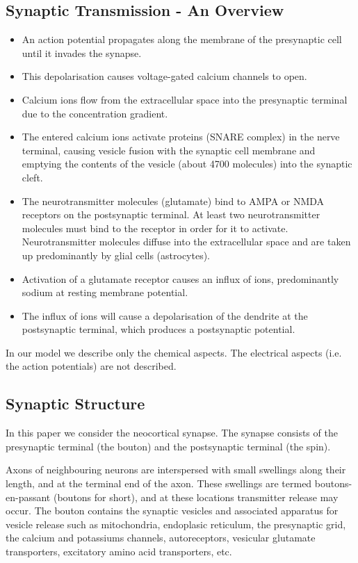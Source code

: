 \documentclass[a4paper]{article}
\begin{document}
\subsection{Synaptic Transmission - An Overview}
\begin{itemize}
    \item An action potential propagates along the membrane of the presynaptic cell until it invades the synapse.
    \item This depolarisation causes voltage-gated calcium channels to open.
    \item Calcium ions flow from the extracellular space into the presynaptic terminal due to the concentration gradient.
    \item The entered calcium ions activate proteins (SNARE complex) in the nerve terminal, causing vesicle fusion with the synaptic cell membrane and emptying the contents of the vesicle (about 4700 molecules) into the synaptic cleft.
    \item The neurotransmitter molecules (glutamate) bind to AMPA or NMDA receptors on the postsynaptic terminal. At least two neurotransmitter molecules  must bind to the receptor in order for it to activate. Neurotransmitter molecules diffuse into the extracellular space and are taken up predominantly by glial cells (astrocytes). 
    \item Activation of a glutamate receptor causes an influx of ions, predominantly sodium at resting membrane potential. 
    \item The influx of ions will cause a depolarisation of the dendrite at the postsynaptic terminal, which produces a postsynaptic potential.
\end{itemize}

In our model we describe only the chemical aspects. The electrical aspects (i.e. the action potentials) are not described.

\subsection{Synaptic Structure}
In this paper we consider the neocortical synapse. The synapse consists of the presynaptic terminal (the bouton) and the postsynaptic terminal (the spin). 

Axons of neighbouring neurons are interspersed with small swellings along their length, and at the terminal end of the axon. These swellings are termed boutons-en-passant (boutons for short), and at these locations transmitter release may occur. The bouton contains the synaptic vesicles and associated apparatus for vesicle release such as mitochondria, endoplasic reticulum, the presynaptic grid, the calcium and potassiums channels, autoreceptors, vesicular glutamate transporters, excitatory amino acid transporters, etc.
\end{document}
